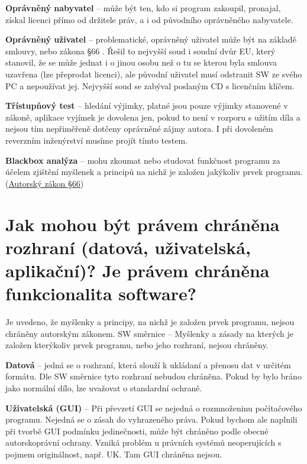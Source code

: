 \textbf{Oprávněný nabyvatel} -- může být ten, kdo si program zakoupil, pronajal, získal licenci přímo od držitele práv, a i od původního oprávněného nabyvatele.

\textbf{Oprávněný uživatel} -- problematické, oprávněný uživatel může být na základě smlouvy, nebo zákona §66 . Řešil to nejvyšší soud i soudní dvůr EU, který stanovil, že se může jednat i o jinou osobu než o tu se kterou byla smlouva uzavřena (lze přeprodat licenci), ale původní uživatel musí odstranit SW ze svého PC a nepoužívat jej. Nejvyšší soud se zabýval poslaným CD s licenčním klíčem.

\textbf{Třístupňový test} -- hledání výjimky, platné jsou pouze výjimky stanovené v zákoně, aplikace vyjímek je dovolena jen, pokud to není v rozporu s užitím díla a nejsou tím nepřiměřeně dotčeny oprávněné zájmy autora. I při dovoleném reverzním inženýrství musíme projít tímto testem.

\textbf{Blackbox analýza} -- mohu zkoumat nebo studovat funkčnost programu za účelem zjištění myšlenek a principů na nichž je založen jakýkoliv prvek programu. (\href{https://www.zakonyprolidi.cz/cs/2000-121#p66}{Autorský zákon §66})


\section{Jak mohou být právem chráněna rozhraní (datová, uživatelská, aplikační)? Je právem chráněna funkcionalita software?}

Je uvedeno, že myšlenky a principy, na nichž je založen prvek programu, nejsou chráněny autorským zákonem. SW směrnice -- Myšlenky a zásady na kterých je založen kterýkoliv prvek programu, nebo jeho rozhraní, nejsou chráněny. 

\textbf{Datová} -- jedná se o rozhraní, která slouží k ukládaní a přenosu dat v určitém formátu. Dle SW směrnice tyto rozhraní nebudou chráněna. Pokud by bylo bráno jako normální dílo, lze uvažovat o standardní ochraně.

\textbf{Uživatelská (GUI)} -- Při převzetí GUI se nejedná o rozmnoženinu počítačového programu. \textrightarrow Nejedná se o zásah do vyhrazeného práva. Pokud bychom ale naplnili při tvorbě GUI podmínku jedinečnosti, může být chráněno podle obecné autorskoprávní ochrany. Vzniká problém u právních systémů neoperujících s pojmem originálnost, např. UK\@. Tam GUI chráněna nejsou.

